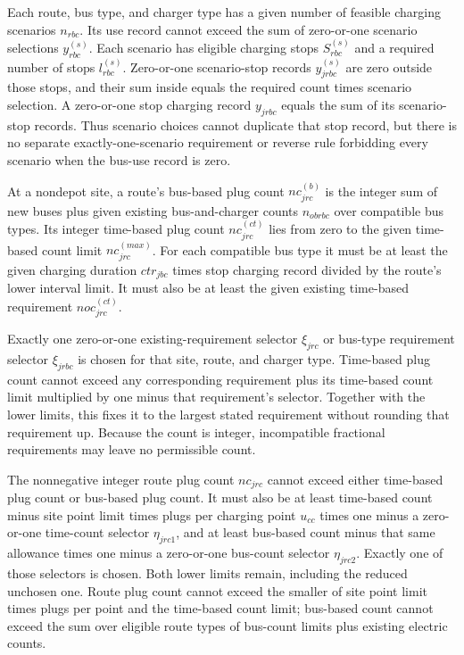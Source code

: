 \documentclass[10pt]{article}
\begin{document}
Each route, bus type, and charger type has a given number of feasible charging scenarios $n_{rbc}$. Its use record cannot exceed the sum of zero-or-one scenario selections $y_{rbc}^{(s)}$. Each scenario has eligible charging stops $S_{rbc}^{(s)}$ and a required number of stops $l_{rbc}^{(s)}$. Zero-or-one scenario-stop records $y_{jrbc}^{(s)}$ are zero outside those stops, and their sum inside equals the required count times scenario selection. A zero-or-one stop charging record $y_{jrbc}$ equals the sum of its scenario-stop records. Thus scenario choices cannot duplicate that stop record, but there is no separate exactly-one-scenario requirement or reverse rule forbidding every scenario when the bus-use record is zero.

At a nondepot site, a route's bus-based plug count $nc_{jrc}^{(b)}$ is the integer sum of new buses plus given existing bus-and-charger counts $n_{obrbc}$ over compatible bus types. Its integer time-based plug count $nc_{jrc}^{(ct)}$ lies from zero to the given time-based count limit $nc_{jrc}^{(max)}$. For each compatible bus type it must be at least the given charging duration $ctr_{jbc}$ times stop charging record divided by the route's lower interval limit. It must also be at least the given existing time-based requirement $noc_{jrc}^{(ct)}$.

Exactly one zero-or-one existing-requirement selector $\xi_{jrc}$ or bus-type requirement selector $\xi_{jrbc}$ is chosen for that site, route, and charger type. Time-based plug count cannot exceed any corresponding requirement plus its time-based count limit multiplied by one minus that requirement's selector. Together with the lower limits, this fixes it to the largest stated requirement without rounding that requirement up. Because the count is integer, incompatible fractional requirements may leave no permissible count.

The nonnegative integer route plug count $nc_{jrc}$ cannot exceed either time-based plug count or bus-based plug count. It must also be at least time-based count minus site point limit times plugs per charging point $u_{cc}$ times one minus a zero-or-one time-count selector $\eta_{jrc1}$, and at least bus-based count minus that same allowance times one minus a zero-or-one bus-count selector $\eta_{jrc2}$. Exactly one of those selectors is chosen. Both lower limits remain, including the reduced unchosen one. Route plug count cannot exceed the smaller of site point limit times plugs per point and the time-based count limit; bus-based count cannot exceed the sum over eligible route types of bus-count limits plus existing electric counts.
\end{document}
